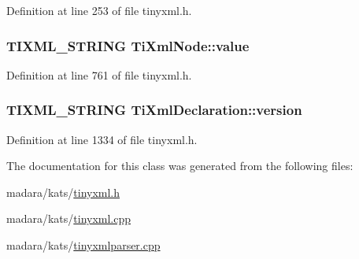 Definition at line 253 of file tinyxml.h.

\hypertarget{classTiXmlNode_aead528b3cedc33c16a6c539872c7cc8b}{
\subsubsection[{value}]{\setlength{\rightskip}{0pt plus 5cm}TIXML\_\-STRING {\bf TiXmlNode::value}}}
\label{d3/dd5/classTiXmlNode_aead528b3cedc33c16a6c539872c7cc8b}


Definition at line 761 of file tinyxml.h.

\hypertarget{classTiXmlDeclaration_ab9eb14dc9cb78e3a8a0636d5d6a5d04d}{
\subsubsection[{version}]{\setlength{\rightskip}{0pt plus 5cm}TIXML\_\-STRING {\bf TiXmlDeclaration::version}}}
\label{d2/df2/classTiXmlDeclaration_ab9eb14dc9cb78e3a8a0636d5d6a5d04d}


Definition at line 1334 of file tinyxml.h.



The documentation for this class was generated from the following files:\begin{DoxyCompactItemize}
\item 
madara/kats/\hyperlink{tinyxml_8h}{tinyxml.h}\item 
madara/kats/\hyperlink{tinyxml_8cpp}{tinyxml.cpp}\item 
madara/kats/\hyperlink{tinyxmlparser_8cpp}{tinyxmlparser.cpp}\end{DoxyCompactItemize}
